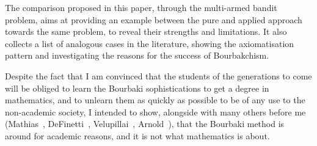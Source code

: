 \documentclass[]{scrartcl}
\theoremstyle{definition}
\begin{document}
The comparison proposed in this paper, through the multi-armed bandit problem, aims at providing an example between the pure and applied approach towards the same problem, to reveal their strengths and limitations. It also collects a list of analogous cases in the literature, showing the axiomatisation pattern and investigating the reasons for the success of Bourbakchism.

Despite the fact that I am convinced that the students of the generations to come will be obliged to learn the Bourbaki sophistications to get a degree in mathematics, and to unlearn them as quickly as possible to be of any use to the non-academic society, I intended to show, alongside with many others before me (Mathias~\cite{mathias1992ignorance}, DeFinetti~\cite{de2008bruno}, Velupillai~\cite{velupillai2012bourbaki}, Arnold~\cite{arnol1998teaching}), that the Bourbaki method is around for academic reasons, and it is not what mathematics is about. %



%
%
%
%
%




\end{document}
